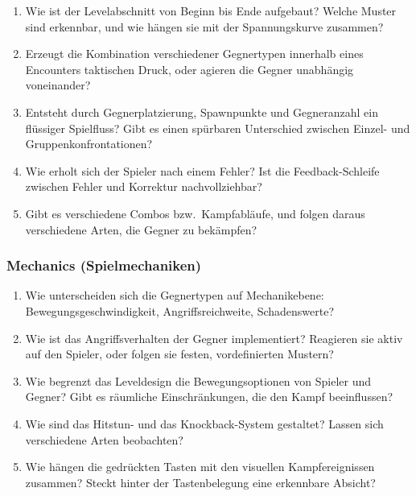 \documentclass[../Main.tex]{subfiles}
\begin{document}
\begin{enumerate}[label=\textbf{D\arabic*}, leftmargin=1.5cm, itemsep=0.5em]
    \item Wie ist der Levelabschnitt von Beginn bis Ende aufgebaut? Welche Muster sind erkennbar, und wie hängen sie mit der Spannungskurve zusammen?
    \item Erzeugt die Kombination verschiedener Gegnertypen innerhalb eines Encounters taktischen Druck, oder agieren die Gegner unabhängig voneinander?
    \item Entsteht durch Gegnerplatzierung, Spawnpunkte und Gegneranzahl ein flüssiger Spielfluss? Gibt es einen spürbaren Unterschied zwischen Einzel- und Gruppenkonfrontationen?
    \item Wie erholt sich der Spieler nach einem Fehler? Ist die Feedback-Schleife zwischen Fehler und Korrektur nachvollziehbar?
    \item Gibt es verschiedene Combos bzw.\ Kampfabläufe, und folgen daraus verschiedene Arten, die Gegner zu bekämpfen?
\end{enumerate}

\subsubsection{Mechanics (Spielmechaniken)}

\begin{enumerate}[label=\textbf{M\arabic*}, leftmargin=1.5cm, itemsep=0.5em]
    \item Wie unterscheiden sich die Gegnertypen auf Mechanikebene: Bewegungsgeschwindigkeit, Angriffsreichweite, Schadenswerte?
    \item Wie ist das Angriffsverhalten der Gegner implementiert? Reagieren sie aktiv auf den Spieler, oder folgen sie festen, vordefinierten Mustern?
    \item Wie begrenzt das Leveldesign die Bewegungsoptionen von Spieler und Gegner? Gibt es räumliche Einschränkungen, die den Kampf beeinflussen?
    \item Wie sind das Hitstun- und das Knockback-System gestaltet? Lassen sich verschiedene Arten beobachten?
    \item Wie hängen die gedrückten Tasten mit den visuellen Kampfereignissen zusammen? Steckt hinter der Tastenbelegung eine erkennbare Absicht?
\end{enumerate}
\end{document}
